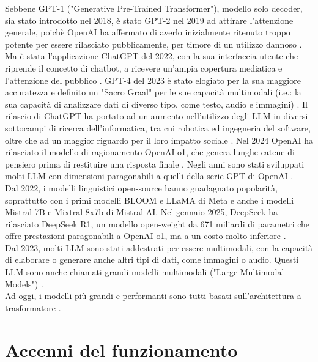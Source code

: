 Sebbene GPT-1 ("Generative Pre-Trained Transformer"), modello solo decoder, sia stato introdotto nel 2018, è stato GPT-2 nel 2019 ad attirare l'attenzione generale, poichè OpenAI ha affermato di averlo inizialmente ritenuto troppo potente per essere rilasciato pubblicamente, per timore di un utilizzo dannoso \cite{hern2019fakeai}. Ma è stata l'applicazione ChatGPT del 2022, con la sua interfaccia utente che riprende il concetto di chatbot, a ricevere un'ampia copertura mediatica e l'attenzione del pubblico \cite{euronews2023chatgpt}. GPT-4 del 2023 è stato elogiato per la sua maggiore accuratezza e definito un "Sacro Graal" per le sue capacità multimodali (i.e.: la sua capacità di analizzare dati di diverso tipo, come testo, audio e immagini) \cite{heaven2023gpt4}. Il rilascio di ChatGPT ha portato ad un aumento nell'utilizzo degli LLM in diversi sottocampi di ricerca dell'informatica, tra cui robotica ed ingegneria del software, oltre che ad un maggior riguardo per il loro impatto sociale \cite{movva2024topics}. Nel 2024 OpenAI ha rilasciato il modello di ragionamento OpenAI o1, che genera lunghe catene di pensiero prima di restituire una risposta finale \cite{metz2024openai}. Negli anni sono stati sviluppati molti LLM con dimensioni paragonabili a quelli della serie GPT di OpenAI \cite{ourworldindata2023parameters}. \\
Dal 2022, i modelli linguistici open-source hanno guadagnato popolarità, soprattutto con i primi modelli BLOOM e LLaMA di Meta e anche i modelli Mistral 7B e Mixtral 8x7b di Mistral AI. Nel gennaio 2025, DeepSeek ha rilasciato DeepSeek R1, un modello open-weight da 671 miliardi di parametri che offre prestazioni paragonabili a OpenAI o1, ma a un costo molto inferiore \cite{sharma2025deepseek}. \\
Dal 2023, molti LLM sono stati addestrati per essere multimodali, con la capacità di elaborare o generare anche altri tipi di dati, come immagini o audio. Questi LLM sono anche chiamati grandi modelli multimodali ("Large Multimodal Models") \cite{zia2024multimodal}. \\
Ad oggi, i modelli più grandi e performanti sono tutti basati sull'architettura a trasformatore \cite{merritt2022transformer}.

\section{Accenni del funzionamento}


